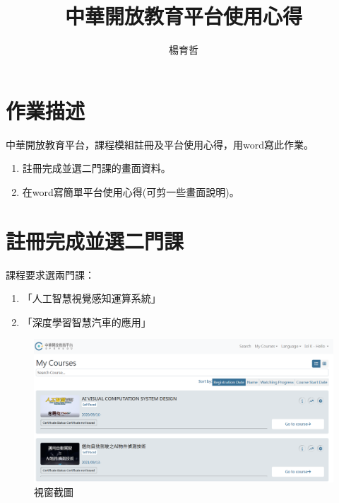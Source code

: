 \documentclass[12pt]{article}
\title{中華開放教育平台使用心得}
\author{楊育哲}
\begin{document}
\maketitle

\section{作業描述}
中華開放教育平台，課程模組註冊及平台使用心得，用word寫此作業。
\begin{enumerate}
    \item 註冊完成並選二門課的畫面資料。
    \item 在word寫簡單平台使用心得(可剪一些畫面說明)。
\end{enumerate}

\section{註冊完成並選二門課}
課程要求選兩門課：
\begin{enumerate}
    \item 「人工智慧視覺感知運算系統」
    \item 「深度學習智慧汽車的應用」
\end{enumerate}

\begin{figure}[h]
    \centering
    \includegraphics[width=1\textwidth]{./assets/sc1.png}
    \caption{視窗截圖}
    \label{fig:example}
\end{figure}

\newpage
\end{document}
